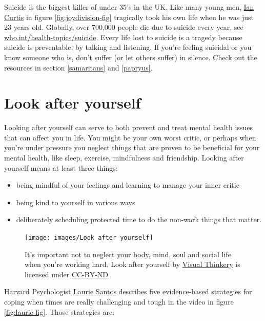\documentclass[
]{book}
\providecommand{\tightlist}{%
  \setlength{\itemsep}{0pt}\setlength{\parskip}{0pt}}
\begin{document}
Suicide is the biggest killer of under 35's in the UK. Like many young men, \href{https://en.wikipedia.org/wiki/Ian_Curtis}{Ian Curtis} in figure \ref{fig:joydivision-fig} tragically took his own life when he was just 23 years old. Globally, over 700,000 people die due to suicide every year, see \href{https://www.who.int/health-topics/suicide}{who.int/health-topics/suicide}. Every life lost to suicide is a tragedy because suicide is preventable, by talking and listening. If you're feeling suicidal or you know someone who is, don't suffer (or let others suffer) in silence. Check out the resources in section \ref{samaritans} and \ref{papryus}.

\hypertarget{lays}{%
\section{Look after yourself}\label{lays}}

Looking after yourself can serve to both prevent and treat mental health issues that can affect you in life. You might be your own worst critic, or perhaps when you're under pressure you neglect things that are proven to be beneficial for your mental health, like sleep, exercise, mindfulness and friendship. Looking after yourself means at least three things:

\begin{itemize}
\tightlist
\item
  being mindful of your feelings and learning to manage your inner critic
\item
  being kind to yourself in various ways
\item
  deliberately scheduling protected time to do the non-work things that matter.
\end{itemize}

\begin{figure}

{\centering \texttt{[image: images/Look after yourself]} 

}

\caption{It's important not to neglect your body, mind, soul and social life when you're working hard. Look after yourself by \href{https://visualthinkery.com}{Visual Thinkery} is licensed under \href{https://creativecommons.org/licenses/by-nd/4.0/}{CC-BY-ND}}\label{fig:lookafter-fig}
\end{figure}



Harvard Psychologist \href{https://en.wikipedia.org/wiki/Laurie_R._Santos}{Laurie Santos} describes five evidence-based strategies for coping when times are really challenging and tough in the video in figure \ref{fig:laurie-fig}. Those strategies are:
\end{document}
